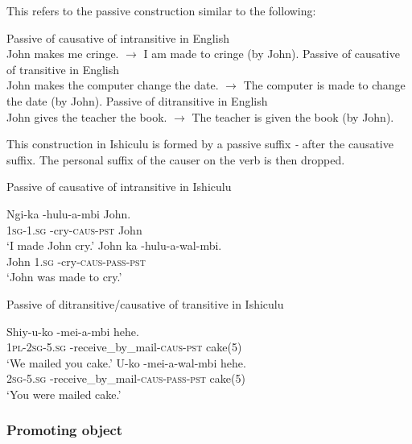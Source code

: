 This refers to the passive construction similar to the following:

\begin{exe}
\ex Passive of causative of intransitive in English \\
John makes me cringe. $\rightarrow$ I am made to cringe (by John).
\ex Passive of causative of transitive in English \\
John makes the computer change the date. $\rightarrow$ The computer is made to change the date (by John).
\ex Passive of ditransitive in English \\
John gives the teacher the book. $\rightarrow$ The teacher is given the book (by John).
\end{exe}

This construction in Ishiculu is formed by a passive suffix \textit{-} after the causative suffix. The personal suffix of the causer on the verb is then dropped.

\begin{exe}
\ex Passive of causative of intransitive in Ishiculu
\begin{xlist}
\ex
\gll Ngi-ka -hulu-\textbeltl a-mbi John. \\
\textsc{1sg}-\textsc{1.sg} -cry-\textsc{caus}-\textsc{pst} John \\
\trans `I made John cry.'
\ex
\gll John ka -hulu-\textbeltl a-wal\textramshorns-mbi. \\
John \textsc{1.sg} -cry-\textsc{caus}-\textsc{pass}-\textsc{pst} \\
\trans `John was made to cry.'
\end{xlist}
\ex Passive of ditransitive/causative of transitive in Ishiculu
\begin{xlist}
\ex
\gll Shiy-u-ko -me\textbeltl i-\textbeltl a-mbi hehe. \\
\textsc{1pl}-\textsc{2sg}-\textsc{5.sg} -receive\_by\_mail-\textsc{caus}-\textsc{pst} cake(5) \\
\trans `We mailed you cake.'
\ex
\gll U-ko -me\textbeltl i-\textbeltl a-wal\textramshorns-mbi hehe. \\
\textsc{2sg}-\textsc{5.sg} -receive\_by\_mail-\textsc{caus}-\textsc{pass}-\textsc{pst} cake(5) \\
\trans `You were mailed cake.'
\end{xlist}
\end{exe}

\subsubsection{Promoting object}

